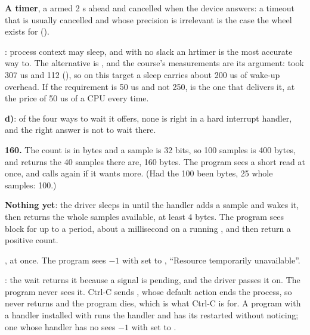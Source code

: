  \textbf{A timer}, a  armed 2 s ahead and cancelled when the device
answers: a timeout that is usually cancelled and whose precision is irrelevant is the case the
wheel exists for ().

 \textbf{}: process context may sleep, and with no slack an
hrtimer is the most accurate way to. The alternative is , and the course's
measurements are its argument:  took 307 us and  112
(), so on this target a sleep carries about 200 us of wake-up overhead. If the
requirement is 50 us and not 250,  is the one that delivers it, at the price of 50 us
of a CPU every time.

 \textbf{d)}: of the four ways to wait it offers, none is right in a hard interrupt
handler, and the right answer is not to wait there.


 \textbf{160.} The count is in bytes and a sample is 32 bits, so 100 samples is 400 bytes,
and  returns the 40 samples there are, 160 bytes. The program sees a short read at once,
and calls  again if it wants more. (Had the 100 been bytes, 25 whole samples: 100.)

 \textbf{Nothing yet}: the driver sleeps in  until the
handler adds a sample and wakes it, then returns the whole samples available, at least 4 bytes. The
program sees  block for up to a period, about a millisecond on a running ,
and then return a positive count.

 \textbf{}, at once. The program sees $-1$ with  set to
, ``Resource temporarily unavailable''.

 \textbf{}: the wait returns it because a signal is pending, and the
driver passes it on. The program never sees it. Ctrl-C sends , whose default action
ends the process, so  never returns and the program dies, which is what Ctrl-C is for. A
program with a handler installed with  runs the handler and has its 
restarted without noticing; one whose handler has no  sees $-1$ with 
set to .

